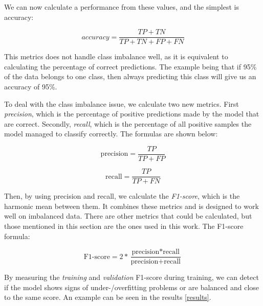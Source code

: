         We can now calculate a performance from these values, and the simplest is accuracy\cite{powers2020evaluation_f1_recall_precision}:
        
        \begin{equation}
            accuracy = \dfrac{TP+TN}{TP+TN+FP+FN} 
        \end{equation}
        
        This metrics does not handle class imbalance well\cite{powers2020evaluation_f1_recall_precision}, as it is equivalent to calculating the percentage of correct predictions. The example being that if 95\% of the data belongs to one class, then always predicting this class will give us an accuracy of 95\%.
        
        To deal with the class imbalance issue, we calculate two new metrics\cite{powers2020evaluation_f1_recall_precision}. First \textit{precision}, which is the percentage of positive predictions made by the model that are correct. Secondly, \textit{recall}, which is the percentage of all positive samples the model managed to classify correctly. The formulas are shown below:
        
        \begin{equation}
            \textrm{precision} = \dfrac{TP}{TP+FP}
        \end{equation}
        
        \begin{equation}
            \textrm{recall} = \dfrac{TP}{TP+FN}
        \end{equation}
        
        Then, by using precision and recall, we calculate the \textit{F1-score}, which is the harmonic mean between them\cite{powers2020evaluation_f1_recall_precision}. It combines these metrics and is designed to work well on imbalanced data. There are other metrics that could be calculated, but those mentioned in this section are the ones used in this work. The F1-score formula:
        
        \begin{equation}
            \textrm{F1-score} = 2 * \dfrac{\textrm{precision} * \textrm{recall}}{\textrm{precision} + \textrm{recall}}
        \end{equation}
        
        By measuring the \textit{training} and \textit{validation} F1-score during training, we can detect if the model shows signs of under-/overfitting problems or are balanced and close to the same score. An example can be seen in the results \ref{results}.

